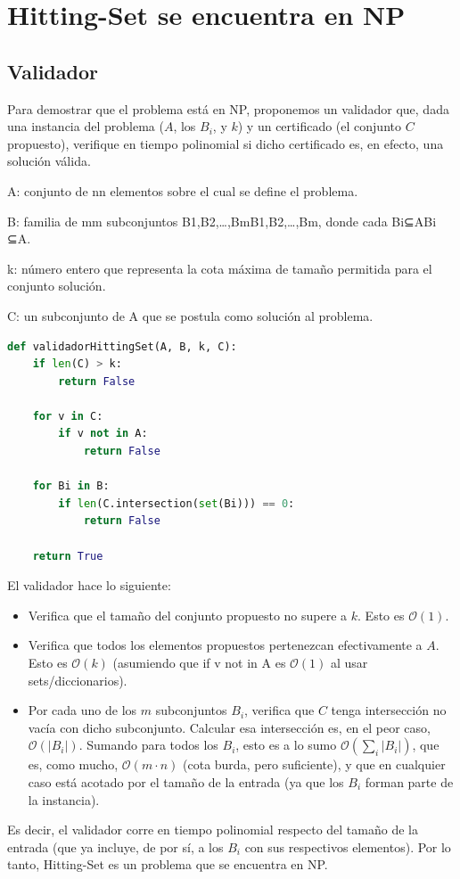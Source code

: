 \section{Hitting-Set se encuentra en NP}

\subsection{Validador}

Para demostrar que el problema está en NP, proponemos un validador que, dada una instancia del problema ($A$, los $B_i$, y
$k$) y un certificado (el conjunto $C$ propuesto), verifique en tiempo polinomial si dicho certificado es, en efecto, una
solución válida.

A: conjunto de nn elementos sobre el cual se define el problema.

B: familia de mm subconjuntos B1,B2,…,BmB1​,B2​,…,Bm​, donde cada Bi⊆ABi​⊆A.

k: número entero que representa la cota máxima de tamaño permitida para el conjunto solución.

C: un subconjunto de A que se postula como solución al problema.

\begin{lstlisting}[language=Python]
def validadorHittingSet(A, B, k, C):
    if len(C) > k:
        return False

    for v in C:
        if v not in A:
            return False

    for Bi in B:
        if len(C.intersection(set(Bi))) == 0:
            return False

    return True
\end{lstlisting}

El validador hace lo siguiente:
\begin{itemize}
    \item Verifica que el tamaño del conjunto propuesto no supere a $k$. Esto es $\mathcal{O}(1)$.
    \item Verifica que todos los elementos propuestos pertenezcan efectivamente a $A$. Esto es $\mathcal{O}(k)$
    (asumiendo que if v not in A es $\mathcal{O}(1)$ al usar sets/diccionarios).
    \item Por cada uno de los $m$ subconjuntos $B_i$, verifica que $C$ tenga intersección no vacía con dicho subconjunto.
    Calcular esa intersección es, en el peor caso, $\mathcal{O}(|B_i|)$. Sumando para todos los $B_i$, esto es a lo sumo
    $\mathcal{O}(\sum_i |B_i|)$, que es, como mucho, $\mathcal{O}(m \cdot n)$ (cota burda, pero suficiente), y que en
    cualquier caso está acotado por el tamaño de la entrada (ya que los $B_i$ forman parte de la instancia).
\end{itemize}

Es decir, el validador corre en tiempo polinomial respecto del tamaño de la entrada (que ya incluye, de por sí, a los $B_i$
con sus respectivos elementos). Por lo tanto, Hitting-Set es un problema que se encuentra en NP.
